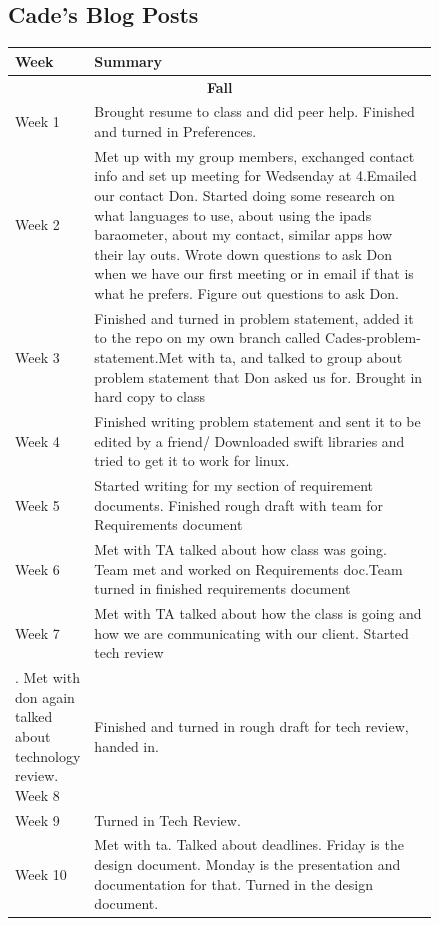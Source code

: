 \documentclass[onecolumn, draftclsnofoot,10pt, compsoc]{IEEEtran}
\begin{document}
\subsection{Cade's Blog Posts}
\begin{center}
	\begin{longtable}{| l | p{0.84\linewidth}|}
		\hline
	Week & Summary \\ \hline
    \multicolumn{2}{c}{\textbf{Fall}} \\ \hline
    Week 1 & Brought resume to class and did peer help. Finished and turned in Preferences.  \\ \hline
	Week 2 & Met up with my group members, exchanged contact info and set up meeting for Wedsenday at 4.Emailed our contact Don. Started doing some research on what languages to use, about using the ipads baraometer, about my contact, similar apps how their lay outs. Wrote down questions to ask Don when we have our first meeting or in email if that is what he prefers. Figure out questions to ask Don.   \\ \hline
	Week 3 & Finished and turned in problem statement, added it to the repo on my own branch called Cades-problem-statement.Met with ta, and talked to group about problem statement that Don asked us for. Brought in hard copy to class    \\ \hline
	Week 4 &  Finished writing problem statement and sent it to be edited by a friend/ Downloaded swift libraries and tried to get it to work for linux. \\ \hline
    Week 5 & Started writing for my section of requirement documents. Finished rough draft with team for Requirements document  \\ \hline
    Week 6 & Met with TA talked about how class was going. Team met and worked on Requirements doc.Team turned in finished requirements document    \\ \hline
	Week 7 &  Met with TA talked about how the class is going and how we are communicating with our client. Started tech review  \\ \hline. Met with don again talked about technology review. 
	Week 8 & Finished and turned in rough draft for tech review, handed in.  \\ \hline
	Week 9 & Turned in Tech Review.    \\ \hline
    Week 10 & Met with ta. Talked about deadlines. Friday is the design document. Monday is the presentation and documentation for that. Turned in the design document.  \\ \hline

\end{longtable}
\end{center}
\end{document}
